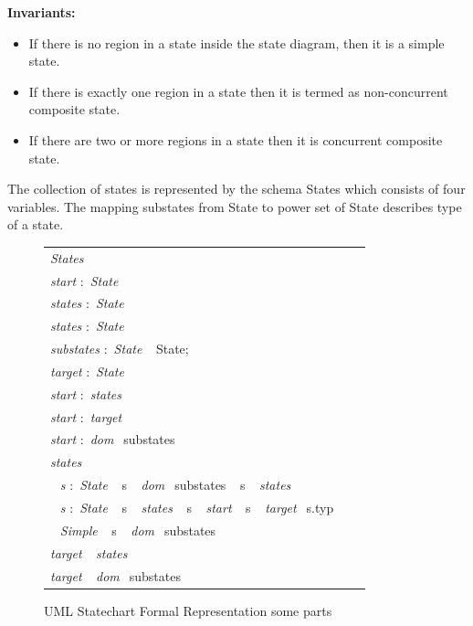 \textbf{Invariants:}
\begin{itemize}
\item  If there is no region in a state inside the state diagram, then it is a simple state.
\item  If there is exactly one region in a state then it is termed as non-concurrent composite state.
\item  If there are two or more regions in a state then it is
concurrent composite state.
\end{itemize}

The collection of states is represented by the schema
States which consists of four variables. The mapping
substates from State to power set of State describes type
of a state.
 \begin{figure}[ht!]
 	\centering
 	\begin{tabular}{lll}
 		\footnotesize                       
 		\textit{States}          \\
 		\footnotesize                       
 		\textit{start}          
 		$:$  \textit{State}\\
 		
 		\textit{states}          
 		$:$  \textit{State}\\
 		
 		\textit{states}           
 		$:$  \textit{State}\\
 		\footnotesize
 		\textit{substates}            $:$         \textit{State} $\ \  $ {State};       \\   
 		\footnotesize
 		\textit{target}             $:$         \textit{State}    \\
 		 \footnotesize                       
 		 \textit{start}           
 		 $:$  \textit{states}\\
 		  \footnotesize                       
 		  \textit{start}          
 		  $:$ \textit{target}\\
 		   \footnotesize                       
 		   \textit{start}           
 		   $:$  \textit{dom} $\ \  ${substates}\\
 		   
 		   \footnotesize                       
 		   \textit{states}          \\ 		
 		$\ \  $ \textit{s}      $:$     \textit{State} $\ \  $ {s} $\ \  $ \textit{dom} $\ \  ${substates} $\ \  $ {s} $\ \  $ \textit{states}        \\ 
 		$\ \  $ \textit{s}      $:$     \textit{State} $\ \  $ {s} $\ \  $ \textit{states} $\ \  $ {s} $\ \  $ \textit{start} $\ \  $ {s} $\ \  $ \textit{target}$\ \  $ {s.typ}\\ 
 		$\ \  $ \textit{Simple} $\ \  $ {s} $\ \  $ \textit{dom} $\ \  ${substates}\\
 		\footnotesize                       
 		\textit{target}  $\ \  $ \textit{states}        \\ 
 		\footnotesize                       
 		\textit{target}  $\ \  $ \textit{dom} $\ \  ${substates}\\	
 	\end{tabular}
 	\caption{UML Statechart Formal Representation some parts}
 	\label{statechart_formal_representation_invariants}
 	\end{figure}

